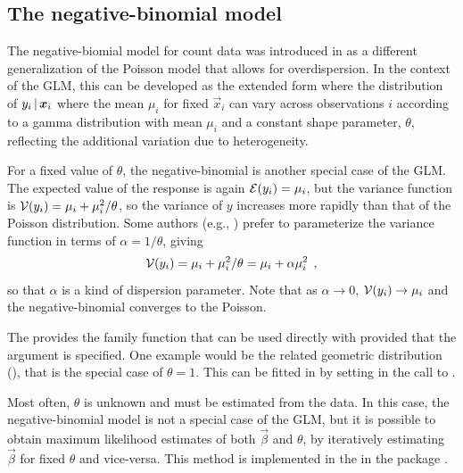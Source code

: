 \documentclass[11pt]{book}\usepackage[]{graphicx}\usepackage[]{color}
\begin{document}
\subsection{The negative-binomial model}\label{sec:glm-negbin}

The negative-biomial model for count data was introduced in 
as a different generalization of the Poisson model that allows for overdispersion. 
In the context of the GLM, this can be developed as the extended form where
the distribution of $y_i \, | \, \bm{x}_i$ where the mean $\mu_i$ for fixed
$\vec{x}_i$ can vary across observations $i$ according to a gamma distribution 
with mean $\mu_i$ and a constant shape parameter, $\theta$, reflecting the
additional variation due to heterogeneity.

For a fixed value of $\theta$, the negative-binomial is another special case of
the GLM.
The expected value of the response is again
$\mathcal{E}(y_i) = \mu_i$, but the variance function is $\mathcal{V}(y_i) = \mu_i + \mu_i^2 / \theta$,
so the variance of $y$ increases more rapidly than that of the Poisson distribution.
Some authors (e.g., \citet{Agresti:2013,Hilbe:2014}) prefer to parameterize the variance
function in terms of $\alpha = 1/\theta$, giving
\begin{equation*}
\mathcal{V}(y_i) = \mu_i + \mu_i^2 / \theta = \mu_i + \alpha \mu_i^2 \:\: ,
\end{equation*}
so that $\alpha$ is a kind of dispersion parameter.  Note that as $\alpha \rightarrow 0$,
$\mathcal{V}(y_i) \rightarrow \mu_i$ and the negative-binomial converges to the Poisson.

The  provides the family function  that
can be used directly with  provided that the argument  is specified.
One example would be the related geometric distribution (),
that is the special case of $\theta=1$. This can be fitted in \R by setting
 in the call to .

Most often, $\theta$ is unknown and must be estimated from the data.
In this case, the negative-binomial model is not a special case of the GLM, 
but it is possible to obtain maximum likelihood estimates of both
$\vec{\beta}$ and $\theta$, by iteratively estimating $\vec{\beta}$ for fixed $\theta$
and vice-versa. This method is implemented in the  in the package .
\end{document}
